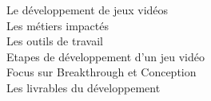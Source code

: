\begin{introduction}

Le développement de jeux vidéos \\
Les métiers impactés \\
Les outils de travail \\
Etapes de développement d'un jeu vidéo \\
Focus sur Breakthrough et Conception \\
Les livrables du développement \\
\end{introduction}


